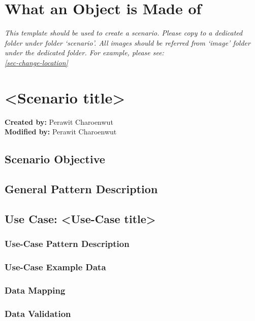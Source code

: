 \section{What an Object is Made of}
\label{chapter-scenario-template}
\textit{This template should be used to create a scenario. Please copy to a dedicated folder under folder `scenario'. All images should be referred from `image' folder under the dedicated folder. For example, please see: \\
\cref{sec-change-location}}

\section*{<Scenario title>}


\textbf{Created by:} Perawit Charoenwut \\
\textbf{Modified by:} Perawit Charoenwut \\

\subsection*{Scenario Objective}


\subsection*{General Pattern Description}





\subsection*{Use Case: <Use-Case title>}

\subsubsection*{Use-Case Pattern Description}

\subsubsection*{Use-Case Example Data}


\subsubsection*{Data Mapping}


\subsubsection*{Data Validation}
